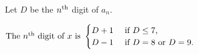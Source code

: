 \documentclass{article}
\begin{document}
\begin{preview}

Let $D$ be the $n^{\mbox{\scriptsize th}}$ digit of $a_n$.

$
\mbox{The $n^{\mbox{\scriptsize th}}$ digit of $x$ is } \begin{cases}
D + 1 & \mbox{ if $D \leq 7$, } \\
D - 1 & \mbox{ if $D = 8$ or $D = 9$. } \\
\end{cases}
$
\end{preview}
\end{document}

